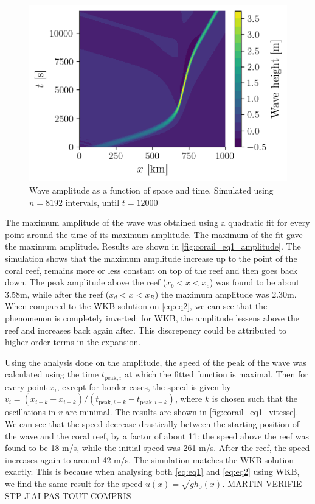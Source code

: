 \begin{figure}[h]
    \centering
    \includegraphics[width=0.6\linewidth]{figures/corail_eq1_mouvement_vague.png}
    \caption{Wave amplitude as a function of space and time. Simulated using \(n=8192\) intervals, until \(t=12000\)}
    \label{fig:corail_eq1_mouv}
\end{figure}

The maximum amplitude of the wave was obtained using a quadratic fit for every point around the time of its maximum amplitude. The maximum of the fit gave the maximum amplitude. Results are shown in \autoref{fig:corail_eq1_amplitude}. The simulation shows that the maximum amplitude increase up to the point of the coral reef, remains more or less constant on top of the reef and then goes back down. The peak amplitude above the reef (\(x_b < x < x_c\)) was found to be about 3.58m, while after the reef (\(x_d<x<x_R\)) the maximum amplitude was 2.30m. When compared to the WKB solution on \autoref{eq:eq2}, we can see that the phenomenon is completely inverted: for WKB, the amplitude lessens above the reef and increases back again after. This discrepency could be attributed to higher order terms in the expansion.

Using the analysis done on the amplitude, the speed of the peak of the wave was calculated using the time \(t_{\textrm{peak},i}\) at which the fitted function is maximal. Then for every point \(x_i\), except for border cases, the speed is given by \(v_i = (x_{i+k} - x_{i-k})/(t_{\textrm{peak},i+k} - t_{\textrm{peak},i-k})\), where \(k\) is chosen such that the oscillations in \(v\) are minimal. The results are shown in \autoref{fig:corail_eq1_vitesse}. We can see that the speed decrease drastically between the starting position of the wave and the coral reef, by a factor of about 11: the speed above the reef was found to be 18 m/s, while the initial speed was 261 m/s. After the reef, the speed increases again to around 42 m/s. The simulation matches the WKB solution exactly. This is because when analysing both \autoref{eq:eq1} and \autoref{eq:eq2} using WKB, we find the same result for the speed \(u(x) = \sqrt{gh_0(x)}\). MARTIN VERIFIE STP J'AI PAS TOUT COMPRIS

